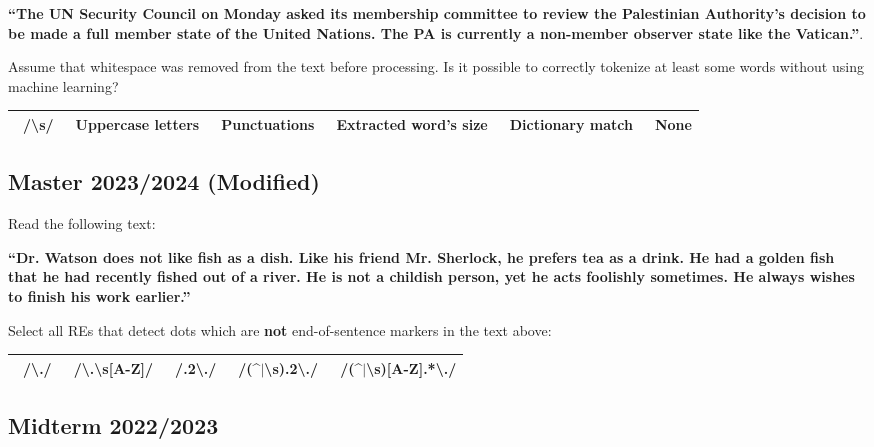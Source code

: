 \documentclass{../extra/aakpract/aakpract}
\begin{document}
	\textbf{``The UN Security Council on Monday asked its membership committee to review the Palestinian Authority's decision to be made a full member state of the United Nations. The PA is currently a non-member observer state like the Vatican.''}.
	
	Assume that whitespace was removed from the text before processing. 
	Is it possible to correctly tokenize at least some words without using machine learning?
	
	\begin{center}
		\begin{tabular}{|llllll|}
			\hline
			\Square\ /\textbackslash s/ & 
			\Square\ Uppercase letters & 
			\Square\ Punctuations & 
			\Square\ Extracted word's size &
			\Square\ Dictionary match &
			\Circle\ None \\
			\hline
		\end{tabular}
	\end{center}
	
	\subsection{Master 2023/2024 (Modified)}
	
	Read the following text:
	
	\textbf{``Dr. Watson does not like fish as a dish. Like his friend Mr. Sherlock, he prefers tea as a drink. He had a golden fish that he had recently fished out of a river.  He is not a childish person, yet he acts foolishly sometimes. He always wishes to finish his work earlier.''}
	
	Select all REs that detect dots which are \textbf{not} end-of-sentence markers in the text above:
	
	\begin{center}
		\begin{tabular}{|lllll|}
			\hline
			\Square\ /\textbackslash./ & 
			\Square\ /\textbackslash.\textbackslash s[A-Z]/ & 
			\Square\ /.{2}\textbackslash./ & 
			\Square\ /(\textasciicircum$|$\textbackslash s).{2}\textbackslash./ &
			\Square\ /(\textasciicircum$|$\textbackslash s)[A-Z].*\textbackslash./\\
			\hline
		\end{tabular}
	\end{center}
	
	\subsection{Midterm 2022/2023}
	
\end{document}
